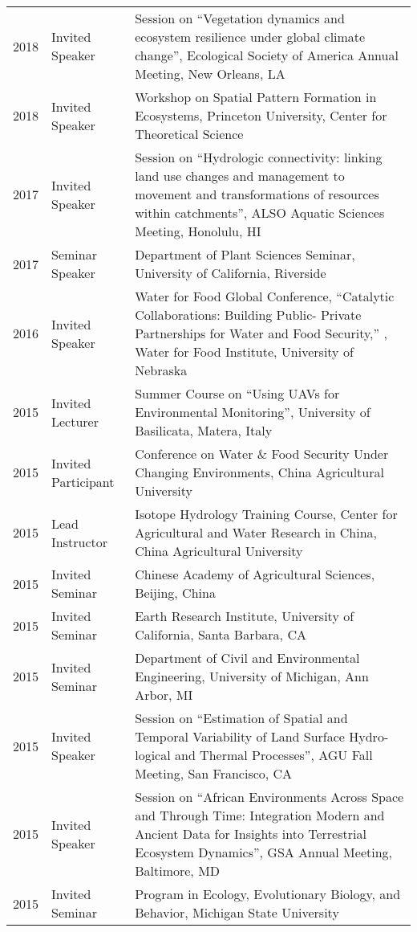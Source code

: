 \begin{longtable}{l p{3.0cm} p{11.5cm}}
2018 & Invited Speaker & Session on ``Vegetation dynamics and ecosystem resilience under global climate change'',  Ecological Society of America Annual Meeting, New Orleans, LA \\
2018 & Invited Speaker & Workshop on Spatial Pattern Formation in Ecosystems, Princeton University, Center for Theoretical Science \\
2017 & Invited Speaker & Session on ``Hydrologic connectivity: linking land use changes and management to movement and transformations of resources within catchments'', ALSO Aquatic Sciences Meeting, Honolulu, HI \\
2017 & Seminar Speaker & Department of Plant Sciences Seminar, University of California, Riverside \\
2016 & Invited Speaker & Water for Food Global Conference, ``Catalytic Collaborations: Building Public- Private Partnerships for Water and Food Security,'' , Water for Food Institute, University of Nebraska \\
2015 & Invited Lecturer & Summer Course on ``Using UAVs for Environmental Monitoring'', University of Basilicata, Matera, Italy \\
2015 & Invited Participant & Conference on Water \& Food Security Under Changing Environments, China Agricultural University \\
2015 & Lead Instructor & Isotope Hydrology Training Course, Center for Agricultural and Water Research in China, China Agricultural University \\
2015 & Invited Seminar & Chinese Academy of Agricultural Sciences, Beijing, China \\
2015 & Invited Seminar & Earth Research Institute, University of California, Santa Barbara, CA \\
2015 & Invited Seminar & Department of Civil and Environmental Engineering, University of Michigan, Ann Arbor, MI \\
2015 & Invited Speaker & Session on ``Estimation of Spatial and Temporal Variability of Land Surface Hydro- logical and Thermal Processes'', AGU Fall Meeting, San Francisco, CA \\
2015 & Invited Speaker & Session on ``African Environments Across Space and Through Time: Integration Modern and Ancient Data for Insights into Terrestrial Ecosystem Dynamics'', GSA Annual Meeting, Baltimore, MD \\
2015 & Invited Seminar & Program in Ecology, Evolutionary Biology, and Behavior, Michigan State University \\

\end{longtable}
